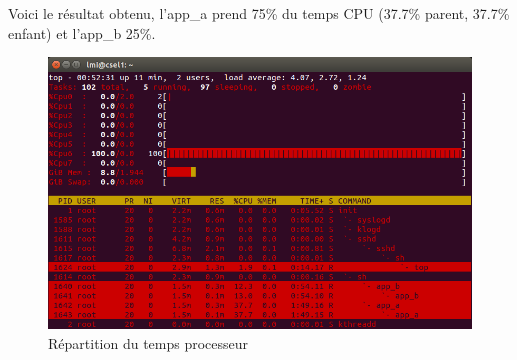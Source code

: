 Voici le résultat obtenu, l'app\_a prend 75\% du temps CPU (37.7\% parent, 37.7\% enfant) et l'app\_b 25\%.
\begin{figure}[H]
	\begin{center}
		\includegraphics[width=16cm]{img/multiprocessCGroup2.png}
		\caption{Répartition du temps processeur}
		\label{multiprocess2}
	\end{center}
\end{figure}
